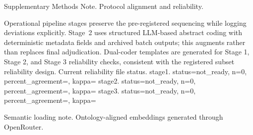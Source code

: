 Supplementary Methods Note. Protocol alignment and reliability.

Operational pipeline stages preserve the pre-registered sequencing while logging deviations explicitly. Stage~2 uses structured LLM-based abstract coding with deterministic metadata fields and archived batch outputs; this augments rather than replaces final adjudication. Dual-coder templates are generated for Stage 1, Stage 2, and Stage 3 reliability checks, consistent with the registered subset reliability design. Current reliability file status.
stage1. status=not\_ready, n=0, percent\_agreement=, kappa=
stage2. status=not\_ready, n=0, percent\_agreement=, kappa=
stage3. status=not\_ready, n=0, percent\_agreement=, kappa=

Semantic loading note. Ontology-aligned embeddings generated through OpenRouter.
